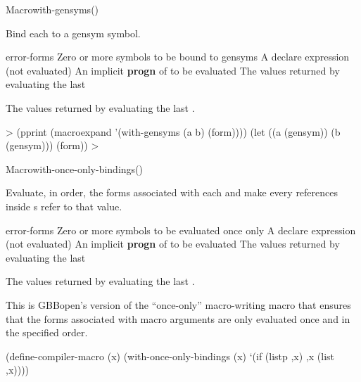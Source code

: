 \documentclass[10pt,twoside,english,pdftex]{article}
\begin{document}
\begin{functiondoc}{Macro}{with-gensyms}{(\superstar{})
    \superstar{}
    \superstar{}
    \returns{} \superstar{}}
\fnsyntax

\fnpurpose Bind each  to a gensym symbol.

\fnpackage {}

\fnmodule {}

\fnargs
\begin{args}{error-forms}
\arg[symbols] Zero or more symbols to be bound to gensyms
\arg[declaration] A declare expression (not evaluated)
\arg[forms] An implicit \textbf{progn} of  to be evaluated
\arg[results] The values returned by evaluating the last 
\end{args}

\fnreturns The values returned by evaluating the last .

\fnexamples
%
\W\supp
\begin{example}
  > (pprint (macroexpand '(with-gensyms (a b) (form))))
  (let ((a (gensym))
        (b (gensym)))
    (form))
  >
\end{example}

\end{functiondoc}


\begin{functiondoc}{Macro}{with-once-only-bindings}{(\superstar{})
    \superstar{}
    \superstar{} 
    \returns{} \superstar{}}

\fnsyntax

\fnpurpose Evaluate, in order, the forms associated with each 
and make every  references inside s refer to that
value.

\fnpackage {}

\fnmodule {}

\fnargs
\begin{args}{error-forms}
\arg[symbols] Zero or more symbols to be evaluated once only
\arg[declaration] A declare expression (not evaluated)
\arg[forms] An implicit \textbf{progn} of  to be evaluated
\arg[results] The values returned by evaluating the last 
\end{args}

\fnreturns The values returned by evaluating the last .

\fndescription This is GBBopen's version of the ``once-only'' macro-writing
macro that ensures that the forms associated with macro arguments are
only evaluated once and in the specified order.

%
\fnexample
%
\W\supp
\begin{example}
  (define-compiler-macro  (x)
    (with-once-only-bindings (x)
      `(if (listp ,x) ,x (list ,x))))
\end{example}

\end{functiondoc}
\end{document}
